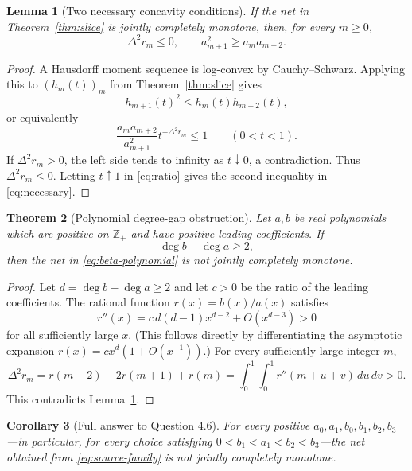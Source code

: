 \documentclass[11pt]{article}
\newtheorem{theorem}{Theorem}
\newtheorem{corollary}[theorem]{Corollary}
\newtheorem{lemma}[theorem]{Lemma}
\newcommand{\Nzero}{\mathbb Z_{+}}
\newcommand{\D}{\Delta}
\begin{document}
\begin{lemma}[Two necessary concavity conditions]\label{lem:concavity}
If the net in Theorem~\ref{thm:slice} is jointly completely monotone, then,
for every $m\ge0$,
\begin{equation}\label{eq:necessary}
 \D^2r_m\le0,
 \qquad
 a_{m+1}^2\ge a_ma_{m+2}.
\end{equation}
\end{lemma}

\begin{proof}
A Hausdorff moment sequence is log-convex by Cauchy--Schwarz.  Applying this
to $(h_m(t))_m$ from Theorem~\ref{thm:slice} gives
\[
 h_{m+1}(t)^2\le h_m(t)h_{m+2}(t),
\]
or equivalently
\begin{equation}\label{eq:ratio}
 \frac{a_ma_{m+2}}{a_{m+1}^2}
 t^{-\D^2r_m}\le1\qquad(0<t<1).
\end{equation}
If $\D^2r_m>0$, the left side tends to infinity as $t\downarrow0$, a
contradiction.  Thus $\D^2r_m\le0$.  Letting $t\uparrow1$ in
\eqref{eq:ratio} gives the second inequality in \eqref{eq:necessary}.
\end{proof}

\begin{theorem}[Polynomial degree-gap obstruction]\label{thm:gap}
Let $a,b$ be real polynomials which are positive on $\Nzero$ and have
positive leading coefficients.  If
\[
 \deg b-\deg a\ge2,
\]
then the net in \eqref{eq:beta-polynomial} is not jointly completely
monotone.
\end{theorem}

\begin{proof}
Let $d=\deg b-\deg a\ge2$ and let $c>0$ be the ratio of the leading
coefficients.  The rational function $r(x)=b(x)/a(x)$ satisfies
\[
 r''(x)=c\,d(d-1)x^{d-2}+O(x^{d-3})>0
\]
for all sufficiently large $x$.  (This follows directly by differentiating
the asymptotic expansion $r(x)=cx^d(1+O(x^{-1}))$.)  For every sufficiently
large integer $m$,
\[
 \D^2r_m
 =r(m+2)-2r(m+1)+r(m)
 =\int_0^1\!\int_0^1r''(m+u+v)\,du\,dv>0.
\]
This contradicts Lemma~\ref{lem:concavity}.
\end{proof}

\begin{corollary}[Full answer to Question 4.6]
For every positive $a_0,a_1,b_0,b_1,b_2,b_3$---in particular, for every
choice satisfying $0<b_1<a_1<b_2<b_3$---the net obtained from
\eqref{eq:source-family} is not jointly completely monotone.
\end{corollary}
\end{document}

